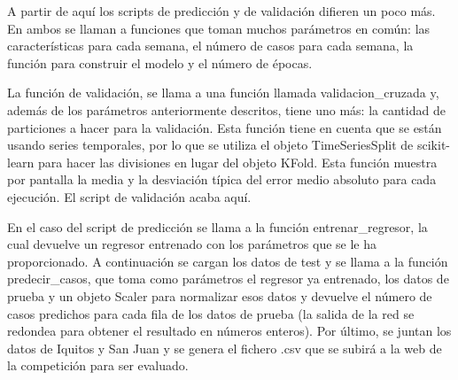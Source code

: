 \documentclass[acmtog, screen]{acmart}
\begin{document}
A partir de aquí los scripts de predicción y de validación difieren un poco más. En ambos se llaman a funciones que toman muchos parámetros en común: las características para cada semana, el número de casos para cada semana, la función para construir el modelo y el número de épocas. 

La función de validación, se llama a una función llamada validacion\_cruzada y, además de los parámetros anteriormente descritos, tiene uno más: la cantidad de particiones a hacer para la validación. Esta función tiene en cuenta que se están usando series temporales, por lo que se utiliza el objeto TimeSeriesSplit de scikit-learn para hacer las divisiones en lugar del objeto KFold. Esta función muestra por pantalla la media y la desviación típica del error medio absoluto para cada ejecución. El script de validación acaba aquí.

En el caso del script de predicción se llama a la función entrenar\_regresor, la cual devuelve un regresor entrenado con los parámetros que se le ha proporcionado. A continuación se cargan los datos de test y se llama a la función predecir\_casos, que toma como parámetros el regresor ya entrenado, los datos de prueba y un objeto Scaler para normalizar esos datos y devuelve el número de casos predichos para cada fila de los datos de prueba (la salida de la red se redondea para obtener el resultado en números enteros). Por último, se juntan los datos de Iquitos y San Juan y se genera el fichero .csv que se subirá a la web de la competición para ser evaluado.
\end{document}
